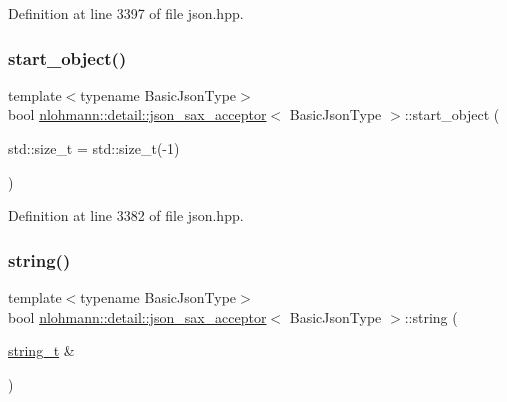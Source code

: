 Definition at line 3397 of file json.\+hpp.

\mbox{\label{classnlohmann_1_1detail_1_1json__sax__acceptor_a822bbca11a9fea0aa337018e351755f5}} 
\subsubsection{\texorpdfstring{start\_object()}{start\_object()}}
{\footnotesize\ttfamily template$<$typename Basic\+Json\+Type$>$ \\
bool \mbox{\hyperlink{classnlohmann_1_1detail_1_1json__sax__acceptor}{nlohmann\+::detail\+::json\+\_\+sax\+\_\+acceptor}}$<$ Basic\+Json\+Type $>$\+::start\+\_\+object (\begin{DoxyParamCaption}\item[{std\+::size\+\_\+t}]{ = {\ttfamily std\+:\+:size\+\_\+t(-\/1)} }\end{DoxyParamCaption})\hspace{0.3cm}{\ttfamily [inline]}}



Definition at line 3382 of file json.\+hpp.

\mbox{\label{classnlohmann_1_1detail_1_1json__sax__acceptor_aaa69255e757a6ecc4403a2aa4931fc60}} 
\subsubsection{\texorpdfstring{string()}{string()}}
{\footnotesize\ttfamily template$<$typename Basic\+Json\+Type$>$ \\
bool \mbox{\hyperlink{classnlohmann_1_1detail_1_1json__sax__acceptor}{nlohmann\+::detail\+::json\+\_\+sax\+\_\+acceptor}}$<$ Basic\+Json\+Type $>$\+::string (\begin{DoxyParamCaption}\item[{\mbox{\hyperlink{classnlohmann_1_1detail_1_1json__sax__acceptor_a3a8078bbf865ec355106f6048241609a}{string\+\_\+t}} \&}]{ }\end{DoxyParamCaption})\hspace{0.3cm}{\ttfamily [inline]}}



